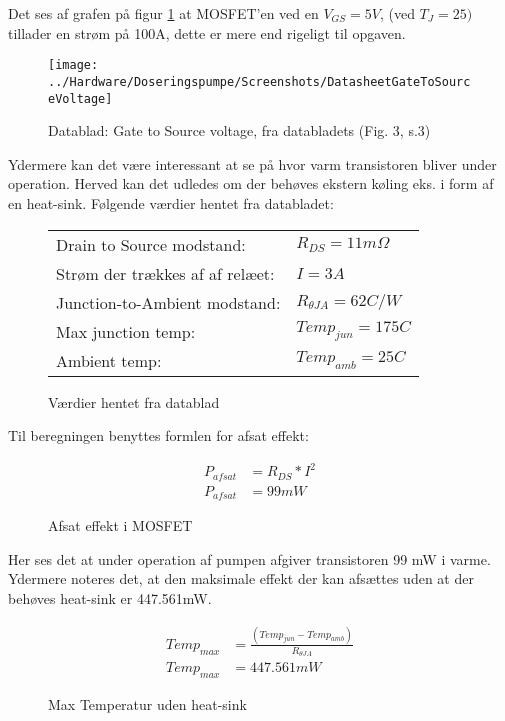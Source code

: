 Det ses af grafen på figur \ref{screenshot:GateToSourceVoltage} at MOSFET'en ved en $ V_{GS} = 5V $, (ved $T_J = 25)$ tillader en strøm på 100A, dette er mere end rigeligt til opgaven.

\begin{figure}[!h]
	\centering
	\texttt{[image: ../Hardware/Doseringspumpe/Screenshots/DatasheetGateToSourceVoltage]}
	\caption{Datablad: Gate to Source voltage, fra databladets (Fig. 3, s.3)}
	\label{screenshot:GateToSourceVoltage}
\end{figure}

Ydermere kan det være interessant at se på hvor varm transistoren bliver under operation. Herved kan det udledes om der behøves ekstern køling eks. i form af en heat-sink.
Følgende værdier hentet fra databladet: 

\begin{figure}[!h]
	\begin{center}
		\begin{tabular}{ l l }
			 Drain to Source modstand:          & $R_{DS}=11 m\Omega$ \\ 
			 Strøm der trækkes af af relæet:    & $I = 3 A$ \\  
			 Junction-to-Ambient modstand:      & $R_{\theta JA}=62 C/W$ \\   
			 Max junction temp:                 & $Temp_{jun}=175 C$ \\
			 Ambient temp:                      & $Temp_{amb}=25 C$ \\
		\end{tabular}
	\end{center}
\caption{Værdier hentet fra datablad}
\end{figure}

Til beregningen benyttes formlen for afsat effekt: 

\begin{figure}[!h]
	\begin{align*}
		P_{afsat} &= R_{DS}*I^2 \\ 
		P_{afsat} &= 99 mW
	\end{align*}
\caption{Afsat effekt i MOSFET}
\label{eq:afsatEffektMOSFET}
\end{figure}

Her ses det at under operation af pumpen afgiver transistoren 99 mW i varme. Ydermere noteres det, at den maksimale effekt der kan afsættes uden at der behøves heat-sink er 447.561mW. 

\begin{figure}[!h]
		\begin{align*}
			Temp_{max} &= \frac{(Temp_{jun}-Temp_{amb})}{R_{\theta JA}} \\ 
			Temp_{max} &= 447.561 mW
		\end{align*}
\label{eq:maxMOSFETeffekt}
\caption{Max Temperatur uden heat-sink}
\end{figure}

